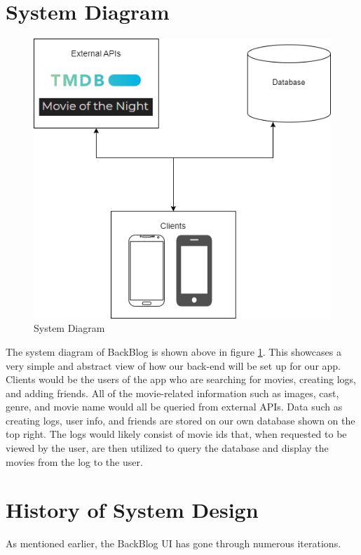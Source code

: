 \documentclass[12pt,asmart]{report}
\begin{document}
\section{System Diagram}
\begin{figure}[H]
    \centering
    \includegraphics[width=1\linewidth]{systemdiagram.png}
    \caption{System Diagram}
    \label{SystemDiagram}
\end{figure}
The system diagram of BackBlog is shown above in figure \ref{SystemDiagram}. This showcases a very simple and abstract view of how our back-end will be set up for our app. Clients would be the users of the app who are searching for movies, creating logs, and adding friends. All of the movie-related information such as images, cast, genre, and movie name would all be queried from external APIs. Data such as creating logs, user info, and friends are stored on our own database shown on the top right. The logs would likely consist of movie ids that, when requested to be viewed by the user, are then utilized to query the database and display the movies from the log to the user.
\section{History of System Design}
As mentioned earlier, the BackBlog UI has gone through numerous iterations. 
\end{document}
